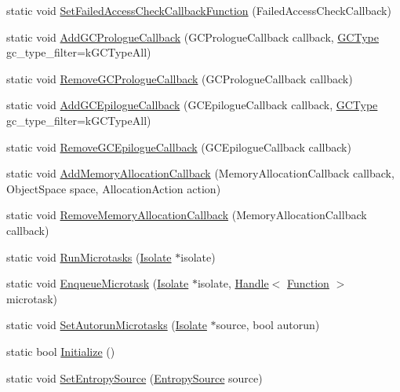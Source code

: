 \begin{DoxyCompactItemize}
\item 
static void \hyperlink{classv8_1_1V8_aa6ed646d43360c209881871b3ac747aa}{Set\-Failed\-Access\-Check\-Callback\-Function} (Failed\-Access\-Check\-Callback)
\item 
static void \hyperlink{classv8_1_1V8_a49c016f17c67f700387f801b2b29b5ab}{Add\-G\-C\-Prologue\-Callback} (G\-C\-Prologue\-Callback callback, \hyperlink{namespacev8_ac109d6f27e0c0f9ef4e98bcf7a806cf2}{G\-C\-Type} gc\-\_\-type\-\_\-filter=k\-G\-C\-Type\-All)
\item 
static void \hyperlink{classv8_1_1V8_a7cdceb9c8ea5cd0887f69fd3bd97193f}{Remove\-G\-C\-Prologue\-Callback} (G\-C\-Prologue\-Callback callback)
\item 
static void \hyperlink{classv8_1_1V8_a37aadf3536c772eb5bbf67fa7822679a}{Add\-G\-C\-Epilogue\-Callback} (G\-C\-Epilogue\-Callback callback, \hyperlink{namespacev8_ac109d6f27e0c0f9ef4e98bcf7a806cf2}{G\-C\-Type} gc\-\_\-type\-\_\-filter=k\-G\-C\-Type\-All)
\item 
static void \hyperlink{classv8_1_1V8_a3382e4dae9865909242a8ee0b1d6bf77}{Remove\-G\-C\-Epilogue\-Callback} (G\-C\-Epilogue\-Callback callback)
\item 
static void \hyperlink{classv8_1_1V8_ac9718f8dc3f3c498bf07282eb7c1618e}{Add\-Memory\-Allocation\-Callback} (Memory\-Allocation\-Callback callback, Object\-Space space, Allocation\-Action action)
\item 
static void \hyperlink{classv8_1_1V8_a1e181f5bf42174b60cd5f4e3a0c20ce8}{Remove\-Memory\-Allocation\-Callback} (Memory\-Allocation\-Callback callback)
\item 
static void \hyperlink{classv8_1_1V8_abca192a0a78615ad2b0ae3590e35c64b}{Run\-Microtasks} (\hyperlink{classv8_1_1Isolate}{Isolate} $\ast$isolate)
\item 
static void \hyperlink{classv8_1_1V8_a84fc6b8fa0cb839be61301b6c5663c73}{Enqueue\-Microtask} (\hyperlink{classv8_1_1Isolate}{Isolate} $\ast$isolate, \hyperlink{classv8_1_1Handle}{Handle}$<$ \hyperlink{classv8_1_1Function}{Function} $>$ microtask)
\item 
static void \hyperlink{classv8_1_1V8_a3fcc5fa4d4a10aab7faa2f0e9bfc7288}{Set\-Autorun\-Microtasks} (\hyperlink{classv8_1_1Isolate}{Isolate} $\ast$source, bool autorun)
\item 
static bool \hyperlink{classv8_1_1V8_a40daec93ce44bdd922567fc121be9db8}{Initialize} ()
\item 
static void \hyperlink{classv8_1_1V8_a5331ce9c858af264f30de667c74c5a76}{Set\-Entropy\-Source} (\hyperlink{namespacev8_a3a9840e090970cbda2427cf6f5594fba}{Entropy\-Source} source)

\end{DoxyCompactItemize}
